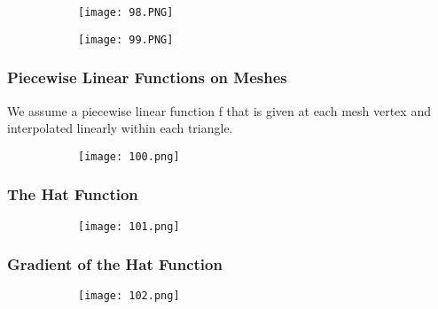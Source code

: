 \documentclass{article}
\begin{document}
\begin{figure}[ht!]
  \centering
  \begin{subfigure}[b]{0.49\linewidth}
    \texttt{[image: 98.PNG]}
  \end{subfigure}
     \begin{subfigure}[b]{0.49\textwidth}
         \centering
         \texttt{[image: 99.PNG]}
     \end{subfigure}
\end{figure}

\subsubsection{Piecewise Linear Functions on Meshes}

We assume a piecewise linear function f that is given at each mesh vertex and interpolated linearly within each triangle.

    \begin{figure}[ht!]
  \centering
  \begin{subfigure}[b]{0.7\linewidth}
    \texttt{[image: 100.png]}
  \end{subfigure}
\end{figure}

\vspace{20mm}

\subsubsection{The Hat Function}

    \begin{figure}[ht!]
  \centering
  \begin{subfigure}[b]{0.8\linewidth}
    \texttt{[image: 101.png]}
  \end{subfigure}
\end{figure}

\subsubsection{Gradient of the Hat Function}

    \begin{figure}[ht!]
  \centering
  \begin{subfigure}[b]{0.8\linewidth}
    \texttt{[image: 102.png]}
  \end{subfigure}
\end{figure}
\end{document}
